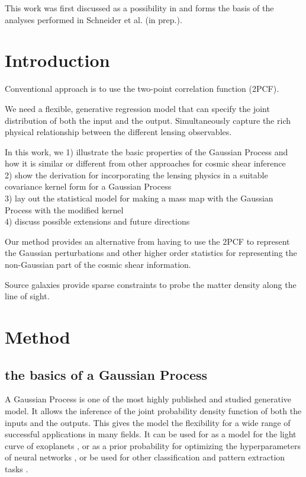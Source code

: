  
This work was first discussed as a possibility in  \citep{Schneider2014}  and 
forms the basis of the analyses performed in Schneider et al. (in prep.).

\section{Introduction} 
 
Conventional approach is to use the two-point correlation function (2PCF).




We need a flexible, generative regression model 
that can specify the joint distribution of both the input and the output.
Simultaneously capture the rich  physical relationship between the different
lensing observables.  


In this work, we 
1) illustrate the basic properties of the Gaussian Process and how it is
similar or different from other approaches for cosmic shear inference  \\ 
2) show the derivation for incorporating the lensing physics in 
a suitable covariance kernel form for a Gaussian Process  \\
3) lay out the statistical model for making a mass map  
with the Gaussian Process with the modified kernel \\ 
4) discuss possible extensions and future directions 
 
Our method provides an alternative from having to use the 2PCF to represent the
Gaussian perturbations and other higher order
statistics for representing the non-Gaussian part of the cosmic shear information. 

Source galaxies provide sparse constraints to probe the matter density along
the line of sight. 

\section{Method}
\subsection{the basics of a Gaussian Process}
A Gaussian Process is one of the most highly published and studied 
generative model. It allows the inference of the joint probability density 
function of both the inputs and the outputs. 
This gives the model the flexibility for a wide range
of successful applications in many fields. 
It can be used for as a model for the light curve of
exoplanets \citep{Ambikasaran2014a}, 
or as a prior probability for optimizing the hyperparameters of
neural networks \citep{Snoek2012}, 
or be used for other classification and pattern extraction tasks 
\citep{Rasmussen2006}.


